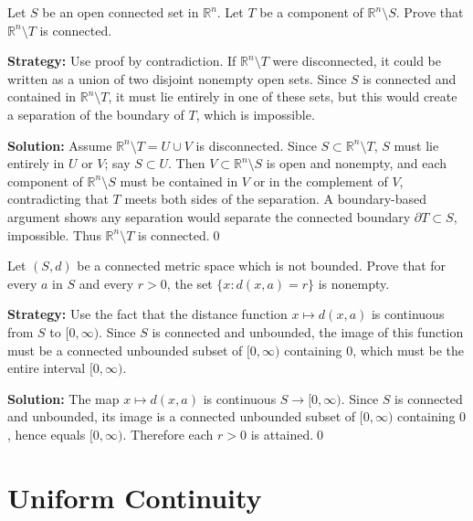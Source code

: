 \begin{problembox}
Let $S$ be an open connected set in $\mathbb{R}^n$. Let $T$ be a component of $\mathbb{R}^n \setminus S$. Prove that $\mathbb{R}^n \setminus T$ is connected.
\end{problembox}

\noindent\textbf{Strategy:} Use proof by contradiction. If $\mathbb{R}^n \setminus T$ were disconnected, it could be written as a union of two disjoint nonempty open sets. Since $S$ is connected and contained in $\mathbb{R}^n \setminus T$, it must lie entirely in one of these sets, but this would create a separation of the boundary of $T$, which is impossible.

\bigskip\noindent\textbf{Solution:}
Assume $\mathbb{R}^n\setminus T=U\cup V$ is disconnected. Since $S\subset\mathbb{R}^n\setminus T$, $S$ must lie entirely in $U$ or $V$; say $S\subset U$. Then $V\subset \mathbb{R}^n\setminus S$ is open and nonempty, and each component of $\mathbb{R}^n\setminus S$ must be contained in $V$ or in the complement of $V$, contradicting that $T$ meets both sides of the separation. A boundary-based argument shows any separation would separate the connected boundary $\partial T\subset S$, impossible. Thus $\mathbb{R}^n\setminus T$ is connected.\qed



\begin{problembox}
Let $(S, d)$ be a connected metric space which is not bounded. Prove that for every $a$ in $S$ and every $r > 0$, the set $\{x : d(x, a) = r\}$ is nonempty.
\end{problembox}

\noindent\textbf{Strategy:} Use the fact that the distance function $x \mapsto d(x,a)$ is continuous from $S$ to $[0,\infty)$. Since $S$ is connected and unbounded, the image of this function must be a connected unbounded subset of $[0,\infty)$ containing $0$, which must be the entire interval $[0,\infty)$.

\bigskip\noindent\textbf{Solution:}
The map $x\mapsto d(x,a)$ is continuous $S\to[0,\infty)$. Since $S$ is connected and unbounded, its image is a connected unbounded subset of $[0,\infty)$ containing $0$, hence equals $[0,\infty)$. Therefore each $r>0$ is attained.\qed

\section{Uniform Continuity}

